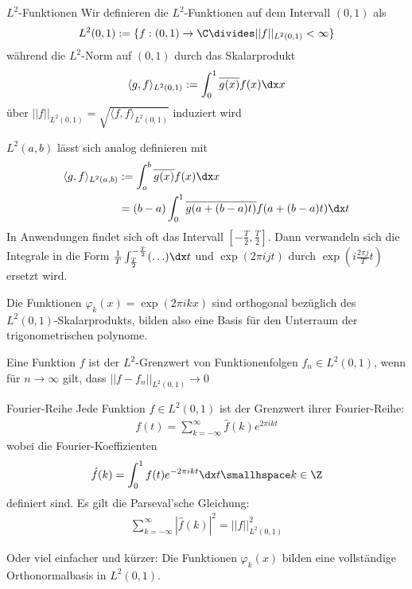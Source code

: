 \begin{definition}[]{$L^2$-Funktionen}
    Wir definieren die $L^2$-Funktionen auf dem Intervall $(0, 1)$ als
    \rmvspace
    \begin{align*}
        L^2(0, 1) := \{ f: (0, 1) \rightarrow \C \divides ||f||_{L^2(0, 1)} < \infty \}
    \end{align*}
    während die $L^2$-Norm auf $(0, 1)$ durch das Skalarprodukt
    \rmvspace
    \begin{align*}
        \langle g, f \rangle_{L^2(0, 1)} := \int_{0}^{1} \overline{g(x)} f(x) \dx x
    \end{align*}
    über $||f||_{L^2(0, 1)} = \sqrt{\langle f, f \rangle_{L^2(0, 1)}}$ induziert wird
\end{definition}

\inlineremark $L^2(a, b)$ lässt sich analog definieren mit
\rmvspace
\begin{align*}
    \langle g, f \rangle_{L^2(a, b)} & := \int_{a}^{b} \overline{g(x)} f(x) \dx x                              \\
                                     & = (b - a) \int_{0}^{1} \overline{g(a + (b - a)t)} f(a + (b - a)t) \dx t
\end{align*}
In Anwendungen findet sich oft das Intervall $\left[ -\frac{T}{2}, \frac{T}{2} \right]$.
Dann verwandeln sich die Integrale in die Form $\frac{1}{T} \int_{\frac{T}{2}}^{-\frac{T}{2}} (\ldots) \dx t$ und $\exp(2\pi ijt)$ durch $\exp(i \frac{2\pi j}{T} t)$ ersetzt wird.

\inlineremark Die Funktionen $\varphi_k(x) = \exp(2\pi ikx)$ sind orthogonal bezüglich des $L^2(0, 1)$-Skalarprodukts, bilden also eine Basis für den Unterraum der trigonometrischen polynome.


\inlinedef Eine Funktion $f$ ist der $L^2$-Grenzwert von Funktionenfolgen $f_n \in L^2(0, 1)$, wenn für $n \rightarrow \infty$ gilt, dass $||f - f_n||_{L^2(0, 1)} \rightarrow 0$


\begin{theorem}[]{Fourier-Reihe}
    Jede Funktion $f \in L^2(0, 1)$ ist der Grenzwert ihrer Fourier-Reihe:
    \rmvspace
    \begin{align*}
        f(t) = \sum_{k = -\infty}^{\infty} \hat{f}(k) e^{2\pi ikt}
    \end{align*}
    wobei die Fourier-Koeffizienten
    \rmvspace
    \begin{align*}
        \hat{f}(k) = \int_{0}^{1} f(t)e^{-2\pi ikt} \dx t \smallhspace k \in \Z
    \end{align*}
    definiert sind. Es gilt die Parseval'sche Gleichung:
    \rmvspace
    \begin{align*}
        \sum_{k = -\infty}^{\infty} |\hat{f}(k)|^2 = ||f||_{L^2(0, 1)}^2
    \end{align*}
\end{theorem}
\inlineremark Oder viel einfacher und kürzer: Die Funktionen $\varphi_k(x)$ bilden eine vollständige Orthonormalbasis in $L^2(0, 1)$.

